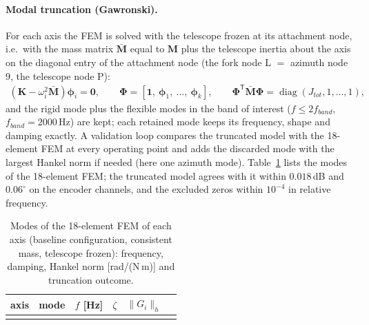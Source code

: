 \documentclass[10pt,a4paper]{article}
\numberwithin{equation}{section}
\begin{document}
\paragraph{Modal truncation (Gawronski).} For each axis the FEM is solved with the telescope frozen at its attachment node, i.e.\ with the mass matrix $\bar{\mathbf M}$ equal to $\mathbf M$ plus the telescope inertia about the axis on the diagonal entry of the attachment node (the fork node L $=$ azimuth node 9, the telescope node P):
\begin{gather}
(\mathbf K - \omega_i^2\bar{\mathbf M})\boldsymbol\phi_i = \mathbf 0, \qquad \boldsymbol\Phi = [\mathbf 1,\ \boldsymbol\phi_1,\ \dots,\ \boldsymbol\phi_k], \qquad \boldsymbol\Phi^{\mathsf T}\bar{\mathbf M}\boldsymbol\Phi = \operatorname{diag}(J_{tot}, 1, \dots, 1),
\end{gather}
and the rigid mode plus the flexible modes in the band of interest ($f \le 2f_{band}$, $f_{band} = 2000$\,Hz) are kept; each retained mode keeps its frequency, shape and damping exactly. A validation loop compares the truncated model with the 18-element FEM at every operating point and adds the discarded mode with the largest Hankel norm if needed (here one azimuth mode). Table~\ref{tab:modes} lists the modes of the 18-element FEM; the truncated model agrees with it within $0.018$\,dB and $0.06^\circ$ on the encoder channels, and the excluded zeros within $10^{-4}$ in relative frequency.
\begin{table}[H]\centering\small
\caption{Modes of the 18-element FEM of each axis (baseline configuration, consistent mass, telescope frozen): frequency, damping, Hankel norm [rad/(N\,m)] and truncation outcome.}\label{tab:modes}
\begin{tabular}{llrrrl}\toprule axis & mode & $f$ [Hz] & $\zeta$ & $\|G_i\|_h$ & \\ \midrule
\\ \bottomrule\end{tabular}\end{table}
\end{document}
